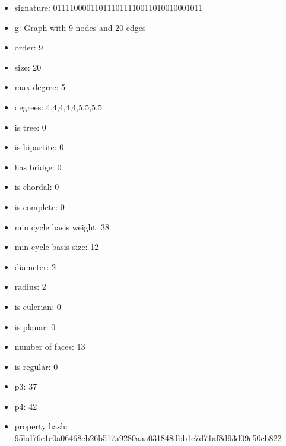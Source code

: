 \newpage
\begin{figure}
\end{figure}
\begin{itemize}
\item signature: 011110000110111011110011010010001011
\item g: Graph with 9 nodes and 20 edges
\item order: 9
\item size: 20
\item max degree: 5
\item degrees: 4,4,4,4,4,5,5,5,5
\item is tree: 0
\item is bipartite: 0
\item has bridge: 0
\item is chordal: 0
\item is complete: 0
\item min cycle basis weight: 38
\item min cycle basis size: 12
\item diameter: 2
\item radius: 2
\item is eulerian: 0
\item is planar: 0
\item number of faces: 13
\item is regular: 0
\item p3: 37
\item p4: 42
\item property hash: 95bd76e1e0a06468cb26b517a9280aaa031848dbb1e7d71af8d93d09e50cb822
\end{itemize}
